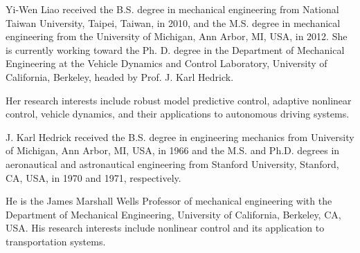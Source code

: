 \documentclass[journal]{IEEEtran}
\begin{document}
\begin{IEEEbiography}{Yi-Wen Liao} 
received the B.S. degree in mechanical engineering from National Taiwan University, Taipei, Taiwan, in 2010, and the M.S. degree in mechanical engineering from the University of Michigan, Ann Arbor, MI, USA, in 2012. She is currently working toward the Ph. D. degree in the Department of Mechanical Engineering at the Vehicle Dynamics and Control Laboratory, University of California, Berkeley, headed by Prof. J. Karl Hedrick. 

Her research interests include robust model predictive control, adaptive nonlinear control, vehicle dynamics, and their applications to autonomous driving systems. 
\end{IEEEbiography}
\vfill 
\begin{IEEEbiography}{J. Karl Hedrick} 
received the B.S. degree in engineering mechanics from University of Michigan, Ann Arbor, MI, USA, in 1966 and the M.S. and Ph.D. degrees in aeronautical and astronautical engineering from Stanford University, Stanford, CA, USA, in 1970 and 1971, respectively.

He is the James Marshall Wells Professor of mechanical engineering with the Department of Mechanical Engineering, University of California, Berkeley, CA, USA. His research interests include nonlinear control and its application to transportation systems.
\end{IEEEbiography}
\vfill 



\end{document}
